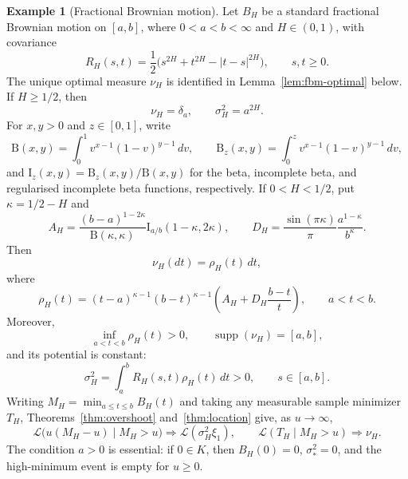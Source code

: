 \documentclass[11pt]{amsart}
\theoremstyle{definition}
\newtheorem{example}[example]{Example}
\theoremstyle{remark}
\providecommand{\supp}{\operatorname{supp}}
\begin{document}
\begin{example}[Fractional Brownian motion]
\label{ex:fbm}
Let $B_H$ be a standard fractional Brownian motion on $[a,b]$, where
$0<a<b<\infty$ and $H\in(0,1)$, with covariance
\[
 R_H(s,t)=\frac12\bigl(s^{2H}+t^{2H}-|t-s|^{2H}\bigr), \qquad s,t\ge 0.
\]
The unique optimal measure $\nu_H$ is identified in
Lemma~\ref{lem:fbm-optimal} below.  If $H\geq1/2$, then
\[
 \nu_H=\delta_a,\qquad \sigma_H^2=a^{2H}.
\]
For $x,y>0$ and $z\in[0,1]$, write
\[
 \mathrm B(x,y)=\int_0^1v^{x-1}(1-v)^{y-1}\,dv,\qquad
 \mathrm B_z(x,y)=\int_0^zv^{x-1}(1-v)^{y-1}\,dv,
\]
and $\mathrm I_z(x,y)=\mathrm B_z(x,y)/\mathrm B(x,y)$ for the beta,
incomplete beta, and regularised incomplete beta functions, respectively.
If $0<H<1/2$, put $\kappa=1/2-H$ and
\[
 A_H=\frac{(b-a)^{1-2\kappa}}{\mathrm B(\kappa,\kappa)}
    \mathrm I_{a/b}(1-\kappa,2\kappa),\qquad
 D_H=\frac{\sin(\pi \kappa)}{\pi}\frac{a^{1-\kappa}}{b^\kappa}.
\]
Then
\[
 \nu_H(dt)=\rho_H(t)\,dt,
\]
where
\[
 \rho_H(t)=(t-a)^{\kappa-1}(b-t)^{\kappa-1}
 \left(A_H+D_H\frac{b-t}{t}\right),\qquad a<t<b.
\]
Moreover,
\[
 \inf_{a<t<b}\rho_H(t)>0,\qquad \supp(\nu_H)=[a,b],
\]
and its potential is constant:
\[
 \sigma_H^2=\int_a^bR_H(s,t)\rho_H(t)\,dt>0,
 \qquad s\in[a,b].
\]
Writing $M_H=\min_{a\leq t\leq b}B_H(t)$ and taking any measurable
sample minimizer $T_H$, Theorems~\ref{thm:overshoot}
and~\ref{thm:location} give, as $u\to\infty$,
\[
 \mathcal L\bigl(u(M_H-u)\mid M_H>u\bigr)
 \Longrightarrow \mathcal L(\sigma_H^2\xi_1),
 \qquad
 \mathcal L(T_H\mid M_H>u)\Longrightarrow\nu_H.
\]
The condition $a>0$ is essential: if $0\in K$, then $B_H(0)=0$,
$\sigma_*^2=0$, and the high-minimum event is empty for $u\geq0$.
\end{example}
\end{document}
